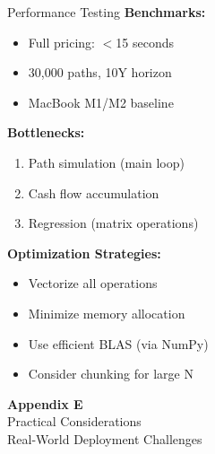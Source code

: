 \documentclass[aspectratio=169,11pt]{beamer}
\begin{document}
\begin{frame}{Performance Testing}
\textbf{Benchmarks:}
\begin{itemize}
    \item Full pricing: $<$15 seconds
    \item 30,000 paths, 10Y horizon
    \item MacBook M1/M2 baseline
\end{itemize}

\textbf{Bottlenecks:}
\begin{enumerate}
    \item Path simulation (main loop)
    \item Cash flow accumulation
    \item Regression (matrix operations)
\end{enumerate}

\textbf{Optimization Strategies:}
\begin{itemize}
    \item Vectorize all operations
    \item Minimize memory allocation
    \item Use efficient BLAS (via NumPy)
    \item Consider chunking for large N
\end{itemize}
\end{frame}


\begin{frame}{}
\begin{center}
\Huge\textbf{Appendix E}\\[1cm]
\Large Practical Considerations\\[0.5cm]
\normalsize Real-World Deployment Challenges
\end{center}
\end{frame}
\end{document}
